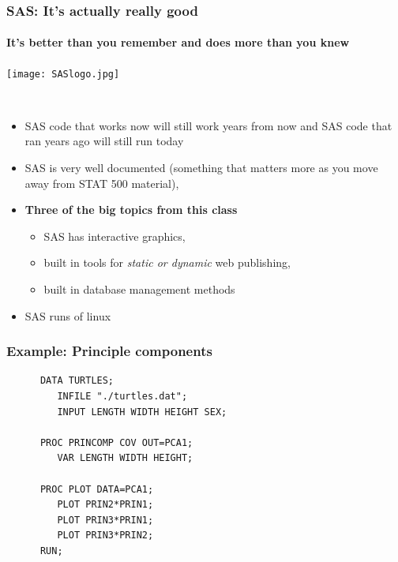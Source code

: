 \documentclass[xcolor=dvipsnames,gray,mathserif]{beamer}
\begin{document}
\begin{frame}
   \frametitle{SAS: It's actually really good}
   \framesubtitle{It's better than you remember and does more than you knew}
   \centerline{\texttt{[image: SASlogo.jpg]}}\\
   \begin{itemize}
      \item SAS code that works now will still work years from now and SAS
         code that ran years ago will still run today 
         \vspace{.2cm}

      \item SAS is very well documented (something that matters 
            more as you move away from STAT 500 material),
         \vspace{.2cm}

         \item \textbf{Three of the big topics from this class}
            \begin{itemize}
               \item SAS has interactive graphics, \\
               \item built in tools for \textit{static or dynamic} web publishing, \\
               \item built in database management methods 
            \end{itemize}
         \vspace{.2cm}

         \item SAS runs of linux
   \end{itemize}
\end{frame}

\begin{frame}[fragile]
   \frametitle{Example: Principle components}
   \begin{verbatim}
      DATA TURTLES;
         INFILE "./turtles.dat";
         INPUT LENGTH WIDTH HEIGHT SEX;

      PROC PRINCOMP COV OUT=PCA1;
         VAR LENGTH WIDTH HEIGHT;

      PROC PLOT DATA=PCA1;
         PLOT PRIN2*PRIN1;
         PLOT PRIN3*PRIN1;
         PLOT PRIN3*PRIN2;
      RUN;
   \end{verbatim}
\end{frame}
\end{document}
